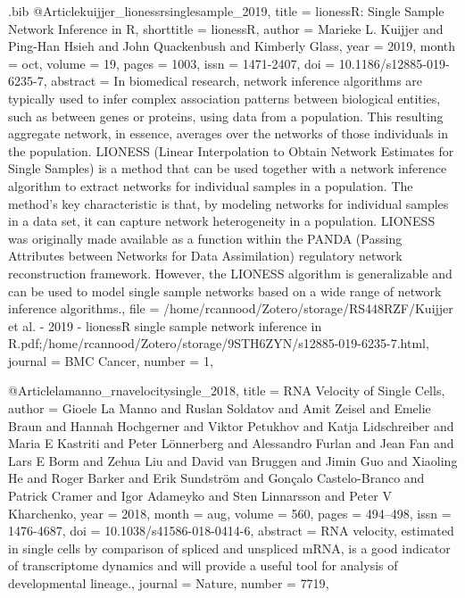 \documentclass[
  table,
  10pt,
  a4paper]{article}
\begin{document}
\begin{filecontents}{\jobname.bib}
@Article{kuijjer_lionessrsinglesample_2019,
	title = {{{lionessR}}: Single Sample Network Inference in {{R}}},
	shorttitle = {{{lionessR}}},
	author = {Marieke L. Kuijjer and Ping-Han Hsieh and John Quackenbush and Kimberly Glass},
	year = {2019},
	month = {oct},
	volume = {19},
	pages = {1003},
	issn = {1471-2407},
	doi = {10.1186/s12885-019-6235-7},
	abstract = {In biomedical research, network inference algorithms are typically used to infer complex association patterns between biological entities, such as between genes or proteins, using data from a population. This resulting aggregate network, in essence, averages over the networks of those individuals in the population. LIONESS (Linear Interpolation to Obtain Network Estimates for Single Samples) is a method that can be used together with a network inference algorithm to extract networks for individual samples in a population. The method's key characteristic is that, by modeling networks for individual samples in a data set, it can capture network heterogeneity in a population. LIONESS was originally made available as a function within the PANDA (Passing Attributes between Networks for Data Assimilation) regulatory network reconstruction framework. However, the LIONESS algorithm is generalizable and can be used to model single sample networks based on a wide range of network inference algorithms.},
	file = {/home/rcannood/Zotero/storage/RS448RZF/Kuijjer et al. - 2019 - lionessR single sample network inference in R.pdf;/home/rcannood/Zotero/storage/9STH6ZYN/s12885-019-6235-7.html},
	journal = {BMC Cancer},
	number = {1},
}

@Article{lamanno_rnavelocitysingle_2018,
	title = {{{RNA Velocity}} of {{Single Cells}}},
	author = {Gioele {La Manno} and Ruslan Soldatov and Amit Zeisel and Emelie Braun and Hannah Hochgerner and Viktor Petukhov and Katja Lidschreiber and Maria E Kastriti and Peter L{\"o}nnerberg and Alessandro Furlan and Jean Fan and Lars E Borm and Zehua Liu and David {van Bruggen} and Jimin Guo and Xiaoling He and Roger Barker and Erik Sundstr{\"o}m and Gon{\c c}alo Castelo-Branco and Patrick Cramer and Igor Adameyko and Sten Linnarsson and Peter V Kharchenko},
	year = {2018},
	month = {aug},
	volume = {560},
	pages = {494--498},
	issn = {1476-4687},
	doi = {10.1038/s41586-018-0414-6},
	abstract = {RNA velocity, estimated in single cells by comparison of spliced and unspliced mRNA, is a good indicator of transcriptome dynamics and will provide a useful tool for analysis of developmental lineage.},
	journal = {Nature},
	number = {7719},
}


\end{filecontents}
\end{document}
